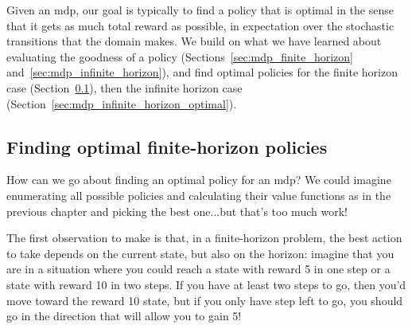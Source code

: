 Given an {\sc mdp}, our goal is typically to find a policy that is
optimal in the sense that it gets as much total reward as possible, in
expectation over the stochastic transitions that the domain makes.  We
build on what we have learned about evaluating the goodness of a
policy (Sections~\ref{sec:mdp_finite_horizon}
and~\ref{sec:mdp_infinite_horizon}), and find optimal policies for the
finite horizon case (Section~\ref{sec:mdp_finite_horizon_optimal}),
then the infinite horizon case
(Section~\ref{sec:mdp_infinite_horizon_optimal}).

\subsection{Finding optimal finite-horizon policies}

\label{sec:mdp_finite_horizon_optimal}

How can we go about finding an optimal policy for an {\sc mdp}?  We
could imagine enumerating all possible policies and calculating their
value functions as in the previous chapter and picking the best
one...but that's too much work!

The first observation to make is that, in a finite-horizon problem,
the best action to take depends on the current state, but also on the
horizon:  imagine that you are in a situation where you could reach a
state with reward 5 in one step or a state with reward 10 in two
steps.  If you have at least two steps to go, then you'd move toward
the reward 10 state, but if you only have step left to go, you should
go in the direction that  will  allow you to gain 5!

